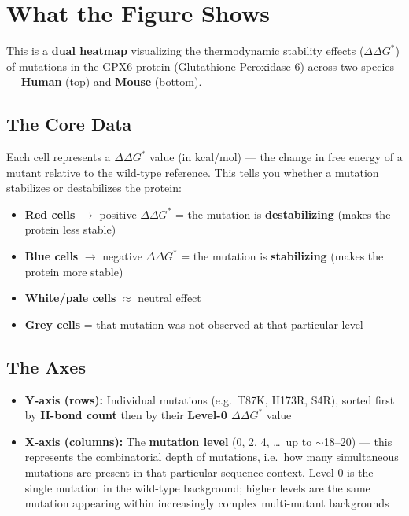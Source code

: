 \documentclass[12pt]{article}
\begin{document}
\section*{What the Figure Shows}

This is a \textbf{dual heatmap} visualizing the thermodynamic stability effects ($\Delta\Delta G^{*}$) of mutations in the GPX6 protein (Glutathione Peroxidase 6) across two species --- \textbf{Human} (top) and \textbf{Mouse} (bottom).

\subsection*{The Core Data}

Each cell represents a $\Delta\Delta G^{*}$ value (in kcal/mol) --- the change in free energy of a mutant relative to the wild-type reference. This tells you whether a mutation stabilizes or destabilizes the protein:

\begin{itemize}
\item \textbf{Red cells} $\rightarrow$ positive $\Delta\Delta G^{*}$ = the mutation is \textbf{destabilizing} (makes the protein less stable)
\item \textbf{Blue cells} $\rightarrow$ negative $\Delta\Delta G^{*}$ = the mutation is \textbf{stabilizing} (makes the protein more stable)
\item \textbf{White/pale cells} $\approx$ neutral effect
\item \textbf{Grey cells} = that mutation was not observed at that particular level
\end{itemize}

\subsection*{The Axes}

\begin{itemize}
\item \textbf{Y-axis (rows):} Individual mutations (e.g.\ T87K, H173R, S4R), sorted first by \textbf{H-bond count} then by their \textbf{Level-0 $\Delta\Delta G^{*}$} value
\item \textbf{X-axis (columns):} The \textbf{mutation level} (0, 2, 4, \ldots\ up to $\sim$18--20) --- this represents the combinatorial depth of mutations, i.e.\ how many simultaneous mutations are present in that particular sequence context. Level 0 is the single mutation in the wild-type background; higher levels are the same mutation appearing within increasingly complex multi-mutant backgrounds
\end{itemize}
\end{document}
